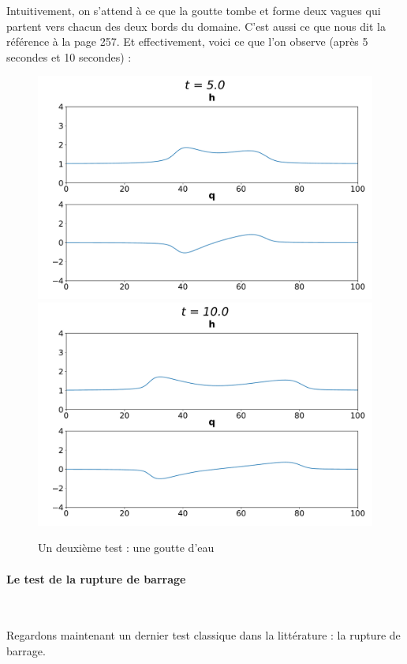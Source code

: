 \documentclass[
11pt, %
francais, %
singlespacing, %
headsepline, %
f%
]{MastersDoctoralThesis} %
\theoremstyle{definition}
\begin{document}
Intuitivement, on s'attend à ce que la \og goutte \fg{} tombe et forme deux vagues qui partent vers chacun des deux bords du domaine.
C'est aussi ce que nous dit la référence \cite{RL} à la page 257. Et effectivement, voici ce que l'on observe (après 5 secondes et 10 secondes) :

\begin{figure}
\includegraphics[scale = .6]{bosse5}
\includegraphics[scale = .6]{bosse10} 
\caption{Un deuxième test : une goutte d'eau}
\end{figure}

\paragraph{Le test de la rupture de barrage} \

Regardons maintenant un dernier test classique dans la littérature : la rupture de barrage.
\end{document}
